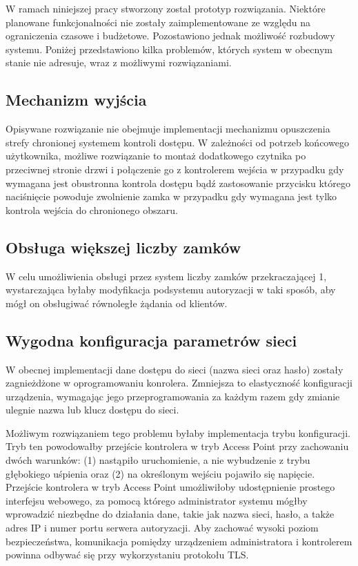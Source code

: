         W ramach niniejszej pracy stworzony został prototyp rozwiązania. Niektóre planowane funkcjonalności nie zostały zaimplementowane ze względu na ograniczenia czasowe i budżetowe. Pozostawiono jednak możliwość rozbudowy systemu. Poniżej przedstawiono kilka problemów, których system w obecnym stanie nie adresuje, wraz z możliwymi rozwiązaniami.

        \subsection{Mechanizm wyjścia}

            Opisywane rozwiązanie nie obejmuje implementacji mechanizmu opuszczenia strefy chronionej systemem kontroli dostępu. W zależności od potrzeb końcowego użytkownika, możliwe rozwiązanie to montaż dodatkowego czytnika po przeciwnej stronie drzwi i połączenie go z kontrolerem wejścia w przypadku gdy wymagana jest obustronna kontrola dostępu bądź zastosowanie przycisku którego naciśnięcie powoduje zwolnienie zamka w przypadku gdy wymagana jest tylko kontrola wejścia do chronionego obszaru.

        \subsection{Obsługa większej liczby zamków}

            W celu umożliwienia obsługi przez system liczby zamków przekraczającej 1, wystarczająca byłaby modyfikacja podsystemu autoryzacji w taki sposób, aby mógł on obsługiwać równoległe żądania od klientów.

        \subsection{Wygodna konfiguracja parametrów sieci}

            W obecnej implementacji dane dostępu do sieci (nazwa sieci oraz hasło) zostały zagnieżdżone w oprogramowaniu konrolera. Zmniejsza to elastyczność konfiguracji urządzenia, wymagając jego przeprogramowania za każdym razem gdy zmianie ulegnie nazwa lub klucz dostępu do sieci.

            Możliwym rozwiązaniem tego problemu byłaby implementacja trybu konfiguracji. Tryb ten powodowałby przejście kontrolera w tryb Access Point przy zachowaniu dwóch warunków: (1) nastąpiło uruchomienie, a nie wybudzenie z trybu głębokiego uśpienia oraz (2) na określonym wejściu pojawiło się napięcie. Przejście kontrolera w tryb Access Point umożliwiłoby udostępnienie prostego interfejsu webowego, za pomocą którego administrator systemu mógłby wprowadzić niezbędne do działania dane, takie jak nazwa sieci, hasło, a także adres IP i numer portu serwera autoryzacji. Aby zachować wysoki poziom bezpieczeństwa, komunikacja pomiędzy urządzeniem administratora i kontrolerem powinna odbywać się przy wykorzystaniu protokołu TLS.

